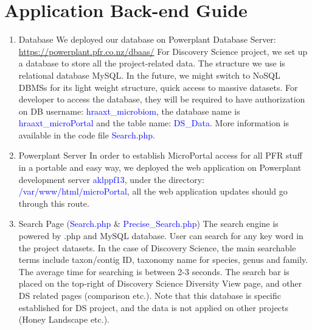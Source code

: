 \documentclass{scrreprt}
\begin{document}
\section{Application Back-end Guide}
\begin{enumerate}
\item {\Large Database}
\newline
\newline
We deployed our database on Powerplant Database Server:
\newline
\url{https://powerplant.pfr.co.nz/dbaas/}
\newline For Discovery Science project, we set up a database to store all the project-related data. The structure we use is relational database MySQL. In the future, we might switch to NoSQL DBMSs for its light weight structure, quick access to massive datasets.
\newline
For developer to access the database, they will be required to have authorization on DB username: \textcolor{blue}{hraaxt\_microbiom}, the database name is \textcolor{blue}{hraaxt\_microPortal} and the table name:  \textcolor{blue}{DS_Data}. More information is available in the code file   \textcolor{blue}{Search.php}.
\item {\Large Powerplant Server}
\newline
\newline
In order to establish MicroPortal access for all PFR stuff in a portable and easy way, we deployed the web application on Powerplant development server \textcolor{blue}{aklppf13}, under the directory:  \textcolor{blue}{/var/www/html/microPortal}, all the web application updates should go through this route.  
\item {\Large Search Page} (\textcolor{blue}{Search.php} \& \textcolor{blue}{Precise_Search.php})
\newline
\newline
The search engine is powered by .php and MySQL database. User can search for any key word in the project datasets. In the case of Discovery Science, the main searchable terms include taxon/contig ID, taxonomy name for species, genus and family. The average time for searching is between 2-3 seconds. The search bar is placed on the top-right of Discovery Science Diversity View page, and other DS related pages (comparison etc.). Note that this database is specific established for DS project, and the data is not applied on other projects (Honey Landscape etc.). 
\newline
\newline

\end{enumerate}
\end{document}
